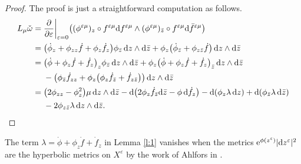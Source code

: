 \documentclass[10pt,a4paper]{amsart}
\numberwithin{equation}{section}
\newcommand{\pa}{\partial}
\newcommand{\vep}{\varepsilon}
\begin{document}
\begin{proof}
The proof is just a straightforward computation as follows.
\begin{align*}
L_{\mu}\check{\omega}={}& \frac{\pa}{\pa\vep}\bigg|_{\vep=0} \big((\phi^{\vep\mu})_z\circ f^{\vep\mu} {\rm d}f^{\vep\mu} \wedge(\phi^{\vep\mu})_{\bar{z}}\circ f^{\vep\mu} {\rm d}\bar{f}^{\vep\mu} \big)
\\[.3ex]
={}&\big(\dot{\phi}_z +\phi_{zz} \dot{f} +\phi_z \dot{f}_{{z}}\big)\phi_{\bar{z}}\, {\rm d}z\wedge {\rm d}\bar{z}+ \phi_z\big(\dot{\phi}_{\bar{z}}+\phi_{z\bar{z}}\dot{f}\big)\, {\rm d}z\wedge {\rm d}\bar{z}
\\[.3ex]
={}&\big(\dot{\phi} +\phi_{z} \dot{f} + \dot{f}_{{z}}\big)_z\phi_{\bar{z}}\, {\rm d}z\wedge {\rm d}\bar{z}+ \phi_z\big(\dot{\phi}+\phi_{z}\dot{f}+\dot{f}_z\big)_{\bar{z}} \, {\rm d}z\wedge {\rm d}\bar{z}
\\[.3ex]
 &-\big(\phi_{\bar{z}} \dot{f}_{zz} +\phi_z\big(\phi_z\dot{f}_{\bar{z}}+\dot{f}_{z\bar{z}}\big)\big)\, {\rm d}z\wedge {\rm d}\bar{z}
 \\[.3ex]
 ={}&\big(2\phi_{zz}-\phi^2_z\big)\mu\, {\rm d}z\wedge {\rm d}\bar{z}-{\rm d}\big(2\phi_z\dot{f}_{\bar{z}}{\rm d}\bar{z}-\phi \,{\rm d}\dot{f}_z\big) -{\rm d}(\phi_z \lambda \,{\rm d}z) +{\rm d}(\phi_{\bar{z}} \lambda \,{\rm d}\bar{z})
 \\[.3ex]
 &-2\phi_{z\bar{z}} \lambda\, {\rm d}z\wedge {\rm d}\bar{z}.\tag*{\qed}
\end{align*}
\renewcommand{\qed}{}
\end{proof}


\begin{Remark}
The term $\lambda=\dot{\phi}+\phi_z \dot{f} +\dot{f}_z$ in Lemma \ref{l:1} vanishes when the metrics ${\rm e}^{\phi(z^\vep)} |{\rm d}z^\vep|^2$ are the hyperbolic metrics on $X^\vep$ by the work of Ahlfors in \cite{3}.
\end{Remark}
\end{document}
